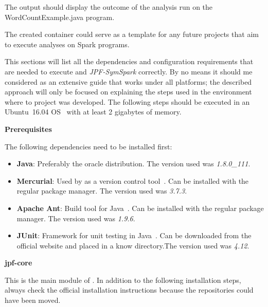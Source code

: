 The output should display the outcome of the analysis run on the WordCountExample.java program.

The created container could serve as a template for any future projects that aim to execute analyses on Spark programs.


This sections will list all the dependencies and configuration requirements that are needed to execute \jpf{} and \textit{JPF-SymSpark} correctly. By no means it should me considered as an extensive guide that works under all platforms; the described approach will only be focused on explaining the steps used in the environment where to project was developed. The following steps should be executed in an Ubuntu~16.04 OS~\cite{Ubuntu2017} with at least 2 gigabytes of memory.

\textbf{Prerequisites}

The following dependencies need to be installed first:

\begin{itemize}
	\item \textbf{Java}: Preferably the oracle distribution. The version used was \textit{1.8.0\_111}.
	\item \textbf{Mercurial}: Used by \jpf{} as a version control tool~\cite{Mercurial2017}. Can be installed with the regular package manager. The version used was \textit{3.7.3}.
	\item \textbf{Apache Ant}: Build tool for Java~\cite{Ant2017}. Can be installed with the regular package manager. The version used was \textit{1.9.6}.
	\item \textbf{JUnit}: Framework for unit testing in Java~\cite{JUnit2017}. Can be downloaded from the official website and placed in a know directory.The version used was \textit{4.12}.
\end{itemize}

\textbf{jpf-core}

This is the main module of \jpf{}. In addition to the following installation steps, always check the official installation instructions because the repositories could have been moved.

